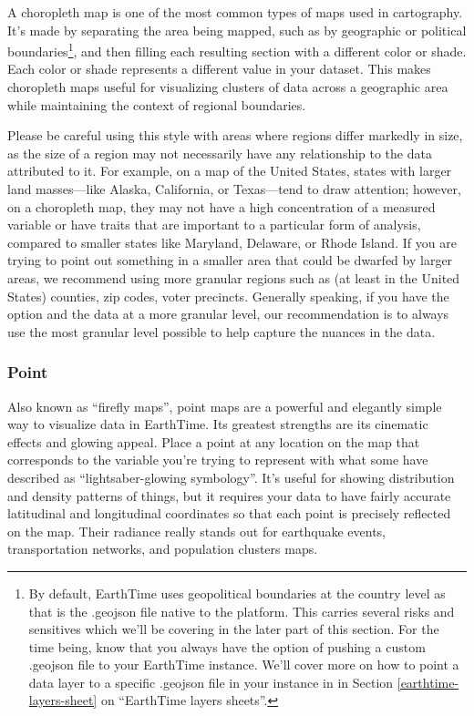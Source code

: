 \documentclass[
]{krantz}
\begin{document}
A choropleth map is one of the most common types of maps used in cartography. It's made by separating the area being mapped, such as by geographic or political boundaries\footnote{ By default, EarthTime uses geopolitical boundaries at the country level as that is the .geojson file native to the platform. This carries several risks and sensitives which we'll be covering in the later part of this section. For the time being, know that you always have the option of pushing a custom .geojson file to your EarthTime instance. We'll cover more on how to point a data layer to a specific .geojson file in your instance in in Section \ref{earthtime-layers-sheet} on ``EarthTime layers sheets''.}, and then filling each resulting section with a different color or shade. Each color or shade represents a different value in your dataset. This makes choropleth maps useful for visualizing clusters of data across a geographic area while maintaining the context of regional boundaries.

Please be careful using this style with areas where regions differ markedly in size, as the size of a region may not necessarily have any relationship to the data attributed to it. For example, on a map of the United States, states with larger land masses---like Alaska, California, or Texas---tend to draw attention; however, on a choropleth map, they may not have a high concentration of a measured variable or have traits that are important to a particular form of analysis, compared to smaller states like Maryland, Delaware, or Rhode Island. If you are trying to point out something in a smaller area that could be dwarfed by larger areas, we recommend using more granular regions such as (at least in the United States) counties, zip codes, voter precincts. Generally speaking, if you have the option and the data at a more granular level, our recommendation is to always use the most granular level possible to help capture the nuances in the data.

\hypertarget{point}{%
\subsubsection*{Point}\label{point}}


Also known as ``firefly maps'', point maps are a powerful and elegantly simple way to visualize data in EarthTime. Its greatest strengths are its cinematic effects and glowing appeal. Place a point at any location on the map that corresponds to the variable you're trying to represent with what some have described as ``lightsaber-glowing symbology''. It's useful for showing distribution and density patterns of things, but it requires your data to have fairly accurate latitudinal and longitudinal coordinates so that each point is precisely reflected on the map. Their radiance really stands out for earthquake events, transportation networks, and population clusters maps.
\end{document}
